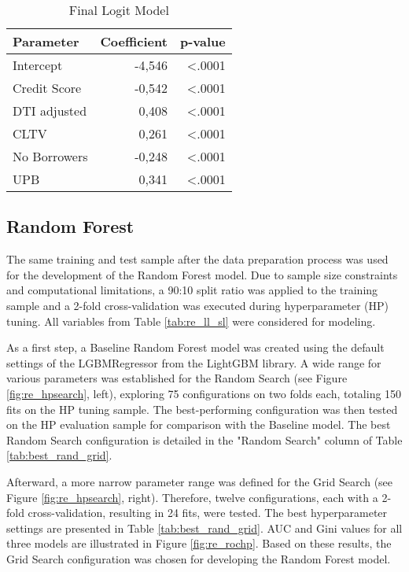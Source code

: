 \begin{table}[H]
\centering
\begin{tabular}{lrr}\toprule
\textbf{Parameter}     	& \textbf{Coefficient} & \textbf{p-value} \\\midrule
Intercept          		& -4,546               & \textless{}.0001 \\
Credit Score       		& -0,542               & \textless{}.0001 \\
DTI adjusted       		& 0,408                & \textless{}.0001 \\
CLTV               		& 0,261                & \textless{}.0001 \\
No Borrowers       		& -0,248               & \textless{}.0001 \\
UPB                		& 0,341                & \textless{}.0001\\\bottomrule
\end{tabular}
\caption{Final Logit Model}
\label{tab:re_finalLogModel}
\end{table}

\subsection{Random Forest}
\label{sec:randfor}
The same training and test sample after the data preparation process was used for the development of the Random Forest model. Due to sample size constraints and computational limitations, a 90:10 split ratio was applied to the training sample and a 2-fold cross-validation was executed during hyperparameter (HP) tuning. All variables from Table \ref{tab:re_ll_sl} were considered for modeling.

As a first step, a Baseline Random Forest model was created using the default settings of the LGBMRegressor from the LightGBM library. A wide range for various parameters was established for the Random Search (see Figure \ref{fig:re_hpsearch}, left), exploring 75 configurations on two folds each, totaling 150 fits on the HP tuning sample. The best-performing configuration was then tested on the HP evaluation sample for comparison with the Baseline model. The best Random Search configuration is detailed in the "Random Search" column of Table \ref{tab:best_rand_grid}. 

Afterward, a more narrow parameter range was defined for the Grid Search (see Figure \ref{fig:re_hpsearch}, right). Therefore, twelve configurations, each with a 2-fold cross-validation, resulting in 24 fits, were tested. The best hyperparameter settings are presented in Table \ref{tab:best_rand_grid}. AUC and Gini values for all three models are illustrated in Figure \ref{fig:re_rochp}. Based on these results, the Grid Search configuration was chosen for developing the Random Forest model.

